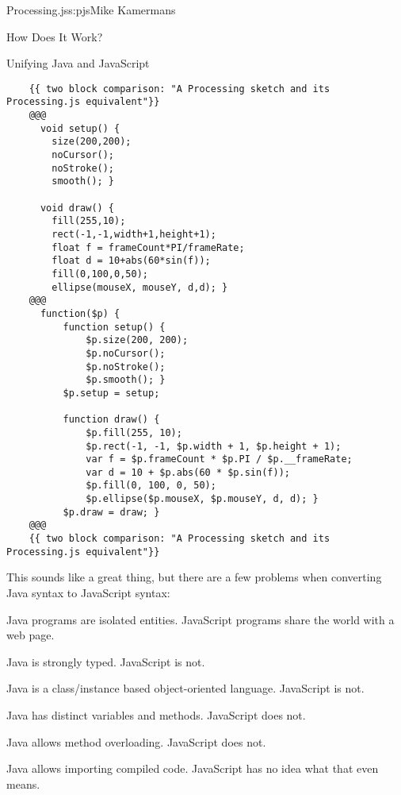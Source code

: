 \begin{aosachapter}{Processing.js}{s:pjs}{Mike Kamermans}
\begin{aosasect1}{How Does It Work?}
\begin{aosasect2}{Unifying Java and JavaScript}

\begin{verbatim}
    {{ two block comparison: "A Processing sketch and its Processing.js equivalent"}}
    @@@
      void setup() {
        size(200,200);
        noCursor();
        noStroke();
        smooth(); }

      void draw() {
        fill(255,10);
        rect(-1,-1,width+1,height+1);
        float f = frameCount*PI/frameRate;
        float d = 10+abs(60*sin(f));
        fill(0,100,0,50);
        ellipse(mouseX, mouseY, d,d); }
    @@@
      function($p) {
          function setup() {
              $p.size(200, 200);
              $p.noCursor();
              $p.noStroke();
              $p.smooth(); }
          $p.setup = setup;

          function draw() {
              $p.fill(255, 10);
              $p.rect(-1, -1, $p.width + 1, $p.height + 1);
              var f = $p.frameCount * $p.PI / $p.__frameRate;
              var d = 10 + $p.abs(60 * $p.sin(f));
              $p.fill(0, 100, 0, 50);
              $p.ellipse($p.mouseX, $p.mouseY, d, d); }
          $p.draw = draw; }
    @@@
    {{ two block comparison: "A Processing sketch and its Processing.js equivalent"}}
\end{verbatim}

This sounds like a great thing, but there are a few problems when
converting Java syntax to JavaScript syntax:

\begin{aosaenumerate}

\item Java programs are isolated entities. JavaScript programs share
  the world with a web page.

\item Java is strongly typed. JavaScript is not.

\item Java is a class/instance based object-oriented language. JavaScript is not.

\item Java has distinct variables and methods. JavaScript does not.

\item Java allows method overloading. JavaScript does not.

\item Java allows importing compiled code. JavaScript has no idea what
  that even means.


\end{aosaenumerate}
\end{aosasect2}
\end{aosasect1}
\end{aosachapter}
